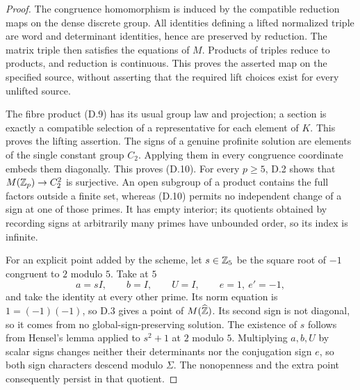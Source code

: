 \begin{proof}
The congruence homomorphism is induced by the compatible reduction
maps on the dense discrete group.  All identities defining a
lifted normalized triple are word and determinant identities,
hence are preserved by reduction.  The matrix triple then satisfies
the equations of \(M\).  Products of triples reduce to products,
and reduction is continuous.  This proves the asserted map
on the specified source, without asserting that the required
lift choices exist for every unlifted source.

The fibre product (D.9) has its usual group law and projection;
a section is exactly a compatible selection of a representative
for each element of \(K\).  This proves the lifting assertion.
The signs of a genuine profinite solution are elements of the
single constant group \(C_2\).  Applying them in every congruence
coordinate embeds them diagonally.  This proves (D.10).
For every \(p\ge5\), D.2 shows that \(M(\mathbb Z_p)\to C_2^2\)
is surjective.  An open subgroup of a product contains the full
factors outside a finite set, whereas (D.10) permits no independent
change of a sign at one of those primes.  It has empty interior;
its quotients obtained by recording signs at arbitrarily many
primes have unbounded order, so its index is infinite.

For an explicit point added by the scheme, let \(s\in\mathbb Z_5\)
be the square root of \(-1\) congruent to \(2\) modulo \(5\).
Take at \(5\)
\[
       a=sI,\qquad b=I,\qquad U=I,\qquad e=1,\ e'=-1,
\]
and take the identity at every other prime.  Its norm equation
is \(1=(-1)(-1)\), so D.3 gives a point of \(M(\widehat{\mathbb Z})\).
Its second sign is not diagonal, so it comes from no
global-sign-preserving solution.  The existence of \(s\) follows
from Hensel's lemma applied to \(s^2+1\) at \(2\) modulo \(5\).
Multiplying \(a,b,U\) by scalar signs changes neither their
determinants nor the conjugation sign \(e\), so both sign
characters descend modulo \(\Sigma\).  The nonopenness and
the extra point consequently persist in that quotient.
\end{proof}

